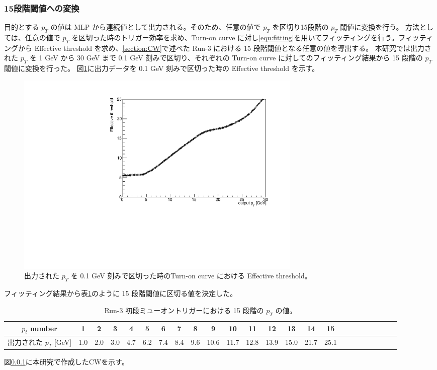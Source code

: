\subsubsection{15段階閾値への変換}
目的とする $p_T$ の値は MLP から連続値として出力される。そのため、任意の値で $p_T$ を区切り15段階の $p_T$ 閾値に変換を行う。
方法としては、任意の値で $p_T$ を区切った時のトリガー効率を求め、Turn-on curve に対し\eqref{equ:fitting}を用いてフィッティングを行う。フィッティングから Effective threshold を求め、\ref{section:CW}で述べた Run-3 における 15 段階閾値となる任意の値を導出する。
本研究では出力された $p_T$ を 1 GeV から 30 GeV まで 0.1 GeV 刻みで区切り、それぞれの Turn-on curve に対してのフィッティング結果から 15 段階の $p_T$ 閾値に変換を行った。
図\ref{fig:Effictive_thr_v1}に出力データを 0.1 GeV 刻みで区切った時の Effective threshold を示す。
\begin{figure}[tb]
  \centering
  \includegraphics[clip, width=14cm]{fig/4/Effictive_thr_v1.pdf}
  \caption{出力された $p_T$ を 0.1 GeV 刻みで区切った時のTurn-on curve における Effective threshold。}
  \label{fig:Effictive_thr_v1}
\end{figure}
フィッティング結果から表\ref{Effective_number}のように 15 段階閾値に区切る値を決定した。
\begin{table}[thb]
\centering
    \caption{Run-3 初段ミューオントリガーにおける 15 段階の $p_T$ の値。}
    \label{Effective_number}
    
    \begin{tabular}{|c|c|c|c|c|c|c|c|c|c|c|c|c|c|c|c|c|c|c|c|c|c|c|c|}
        \hline
        $p_t$ number & 1 & 2 & 3 & 4 & 5 & 6 & 7 & 8 & 9 & 10 & 11 & 12 & 13 & 14 & 15\\
        \hline
        出力された $p_T$ [GeV] & 1.0 & 2.0 & 3.0 & 4.7 & 6.2 & 7.4 & 8.4 & 9.6 & 10.6 & 11.7 & 12.8 & 13.9 & 15.0 & 21.7 & 25.1\\
        \hline
    \end{tabular}
\end{table}

図\ref{}に本研究で作成したCWを示す。



